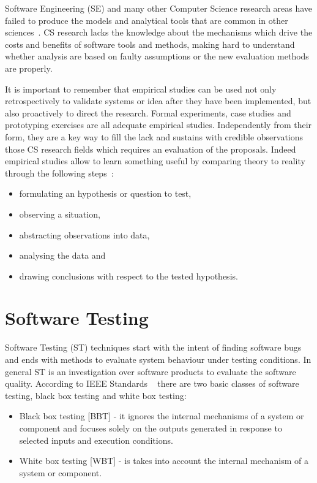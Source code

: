 Software Engineering (SE) and many other Computer Science research areas have failed to produce the models and analytical tools that are common in other sciences~\cite{Perry:2000:ESS:336512.336586}. CS research lacks the knowledge about the mechanisms which drive the costs and benefits of software tools and methods, making hard to understand whether analysis are based on faulty assumptions or the new evaluation methods are properly.

It is important to remember that empirical studies can be used not only retrospectively to validate systems or idea after they have been implemented, but also proactively to direct the research. Formal experiments, case studies and prototyping exercises are all adequate empirical studies. Independently from their form, they are a key way to fill the lack and sustains with credible observations those CS research fields which requires an evaluation of the proposals. Indeed empirical studies allow to learn something useful by comparing theory to reality through the following steps~\cite{Perry:2000:ESS:336512.336586}:
\begin{itemize}
\item  formulating an hypothesis or question to test,
\item  observing a situation,
\item  abstracting observations into data,
\item  analysing the data and
\item  drawing conclusions with respect to the tested hypothesis.
\end{itemize}
\pagebreak

\section{Software Testing}\label{sec:software-testing}
Software Testing (ST) techniques start with the intent of finding software bugs and ends with methods to evaluate system behaviour under testing conditions. In general ST is an investigation over software products to evaluate the software quality. According to IEEE Standards ~\cite{IEEEStd610.12-1990:glossary} there are two basic classes of software testing, black box testing and white box testing: 

\begin{itemize}
\item Black box testing [BBT] - it ignores the internal mechanisms of a system or component and focuses solely on the outputs
generated in response to selected inputs and execution conditions.
\item White box testing [WBT] - is takes into account the internal mechanism of a system or component. 
\end{itemize} 

